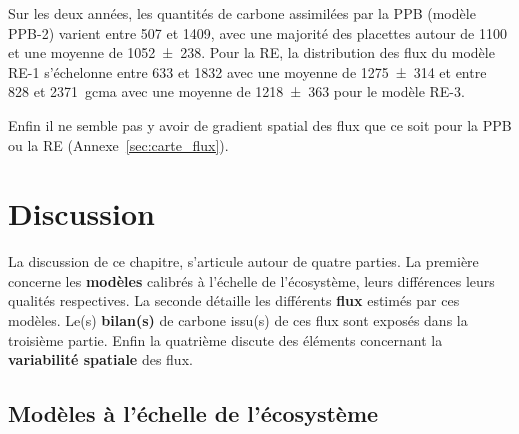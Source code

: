 Sur les deux années, les quantités de carbone assimilées par la PPB (modèle PPB-2) varient entre 507 et \SI{1409}{\gcma}, avec une majorité des placettes autour de \SI{1100}{\gcma} et une moyenne de \SI{1052(238)}{\gcma}.
Pour la RE, la distribution des flux du modèle RE-1 s'échelonne entre 633 et \SI{1832}{\gcma} avec une moyenne de \SI{1275(314)}{\gcma} et entre 828 et \SI{2371}{gcma} avec une moyenne de \SI{1218(363)}{\gcma} pour le modèle RE-3.

Enfin il ne semble pas y avoir de gradient spatial des flux que ce soit pour la PPB ou la RE (Annexe~\ref{sec:carte_flux}).








\section{Discussion}

La discussion de ce chapitre, s'articule autour de quatre parties.
La première concerne les \textbf{modèles} calibrés à l'échelle de l'écosystème, leurs différences leurs qualités respectives.
La seconde détaille les différents \textbf{flux} estimés par ces modèles.
Le(s) \textbf{bilan(s)} de carbone issu(s) de ces flux sont exposés dans la troisième partie.
Enfin la quatrième discute des éléments concernant la \textbf{variabilité spatiale} des flux.

\subsection{Modèles à l'échelle de l'écosystème}


